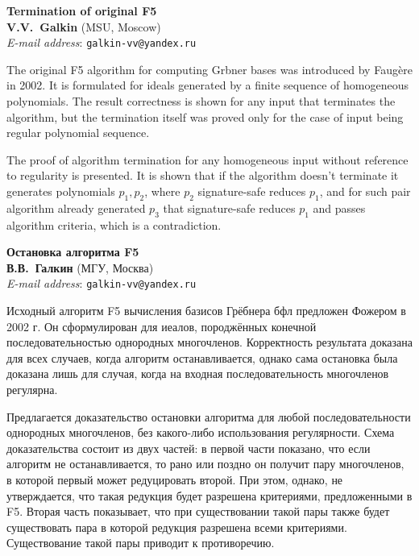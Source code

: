 \documentclass[A4, 12pt, twoside]{article}
\begin{document}
\begin{center} \textbf{
	Termination of original F5 \\[.3cm]
	V.V.~Galkin}  (MSU, Moscow) \\
	\emph{E-mail address}: \texttt{galkin-vv@yandex.ru}\\[.3cm]
\end{center}
\normalsize

The original F5 algorithm for computing Grbner bases was introduced by Faug\`{e}re in 2002.
It is formulated for ideals generated by a finite sequence of homogeneous polynomials.
The result correctness is shown for any input that terminates the algorithm,
but the termination itself was proved only for the case of input being regular polynomial sequence.

The proof of algorithm termination for any homogeneous input without reference to regularity is presented.
It is shown that if the algorithm doesn't terminate it generates polynomials $p_1, p_2$, where $p_2$ signature-safe reduces $p_1$,
and for such pair algorithm already generated $p_3$ that signature-safe reduces $p_1$ and passes algorithm criteria, which is a contradiction.




\begin{center} \textbf{
	Остановка алгоритма F5 \\[.3cm]
	В.В.~Галкин}  (МГУ, Москва) \\
	\emph{E-mail address}: \texttt{galkin-vv@yandex.ru}\\[.3cm]
\end{center}
\normalsize
Исходный алгоритм F5 вычисления базисов Грёбнера бфл предложен Фожером в 2002 г.
Он сформулирован для иеалов, породжённых конечной последовательностью однородных многочленов.
Корректность результата доказана для всех случаев, когда алгоритм останавливается,
однако сама остановка была доказана лишь для случая, когда на входная последовательность многочленов регулярна.

Предлагается доказательство остановки алгоритма для любой последовательности однородных многочленов, без какого-либо использования регулярности.
Схема доказательства состоит из двух частей: в первой части показано, что если алгоритм
не останавливается, то рано или поздно он получит пару многочленов,
в которой первый может редуцировать второй. При этом, однако, не утверждается,
что такая редукция будет разрешена критериями, предложенными в F5.
Вторая часть показывает, что при существовании такой пары также будет
существовать пара в которой редукция разрешена всеми критериями. Существование
такой пары приводит к противоречию.
\end{document}
